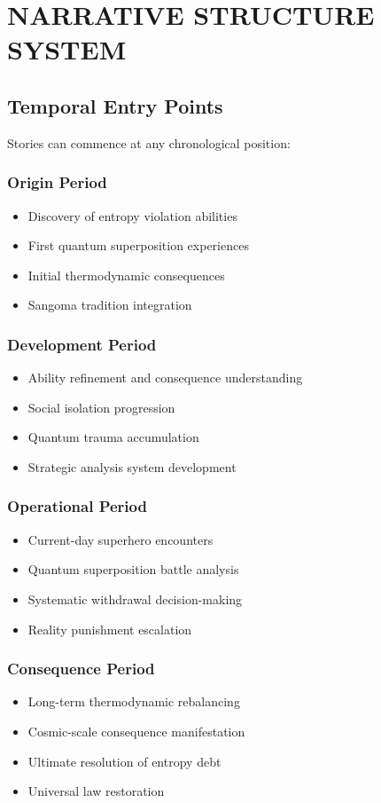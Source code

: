 \documentclass[12pt,a4paper]{article}
\begin{document}
\section{NARRATIVE STRUCTURE SYSTEM}

\subsection{Temporal Entry Points}
Stories can commence at any chronological position:

\subsubsection{Origin Period}
\begin{itemize}
\item Discovery of entropy violation abilities
\item First quantum superposition experiences
\item Initial thermodynamic consequences
\item Sangoma tradition integration
\end{itemize}

\subsubsection{Development Period}
\begin{itemize}
\item Ability refinement and consequence understanding
\item Social isolation progression
\item Quantum trauma accumulation
\item Strategic analysis system development
\end{itemize}

\subsubsection{Operational Period}
\begin{itemize}
\item Current-day superhero encounters
\item Quantum superposition battle analysis
\item Systematic withdrawal decision-making
\item Reality punishment escalation
\end{itemize}

\subsubsection{Consequence Period}
\begin{itemize}
\item Long-term thermodynamic rebalancing
\item Cosmic-scale consequence manifestation
\item Ultimate resolution of entropy debt
\item Universal law restoration
\end{itemize}
\end{document}
